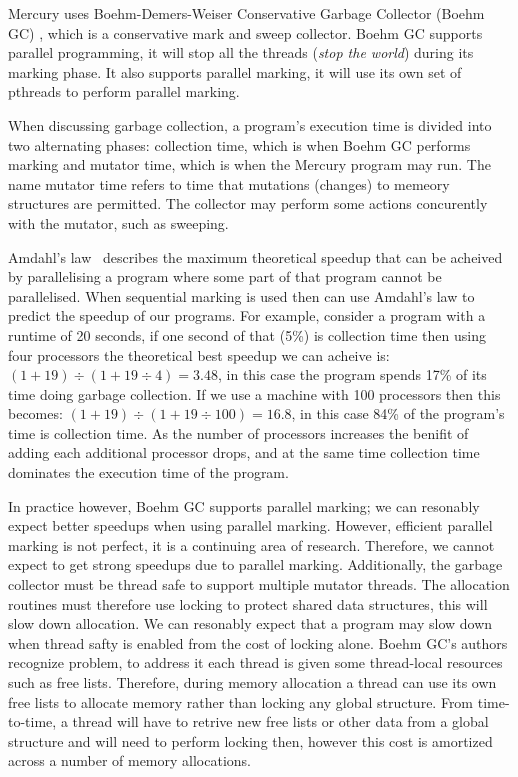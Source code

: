 Mercury uses Boehm-Demers-Weiser Conservative Garbage Collector (Boehm GC)
\citep{boehm_gc},
which is a conservative mark and sweep collector.
Boehm GC supports parallel programming,
it will stop all the threads (\emph{stop the world}) during its marking
phase.
It also supports parallel marking,
it will use its own set of pthreads to perform parallel marking.

When discussing garbage collection,
a program's execution time is divided into two alternating phases:
collection time, which is when Boehm GC performs marking
and mutator time, which is when the Mercury program may run.
The name mutator time refers to time that mutations (changes) to memeory
structures are permitted.
The collector may perform some actions concurently with the mutator,
such as sweeping.

Amdahl's law~\citep{amdahl} describes the maximum theoretical speedup that
can be acheived by parallelising a program where some part of that program
cannot be parallelised.
When sequential marking is used then can use Amdahl's
law to predict the speedup of our programs.
For example, consider a program with a runtime of 20 seconds,
if one second of that (5\%) is collection time
then using four processors the theoretical best speedup we can acheive is:
$(1 + 19) \div (1 + 19\div4) = 3.48$,
in this case the program spends 17\% of its time doing garbage collection.
If we use a machine with 100 processors then this becomes:
$(1 + 19) \div (1 + 19\div100) = 16.8$,
in this case 84\% of the program's time is collection time.
As the number of processors increases the benifit of adding each additional
processor drops,
and at the same time collection time dominates the execution time of the
program.

In practice however,
Boehm GC supports parallel marking;
we can resonably expect better speedups when using parallel marking.
However,
efficient parallel marking is not perfect,
it is a continuing area of research.
Therefore,
we cannot expect to get strong speedups due to parallel marking.
Additionally, 
the garbage collector must be thread safe to support multiple mutator
threads.
The allocation routines must therefore use locking to protect shared data
structures,
this will slow down allocation.
We can resonably expect that a program may slow down when thread safty is
enabled from the cost of locking alone.
Boehm GC's authors recognize problem,
to address it each thread is given some thread-local resources such as free
lists.
Therefore,
during memory allocation a thread can use its own free lists to allocate
memory rather than locking any global structure.
From time-to-time, a thread will have to retrive new free lists or other
data from a global structure and will need to perform locking then,
however this cost is amortized across a number of memory allocations.

